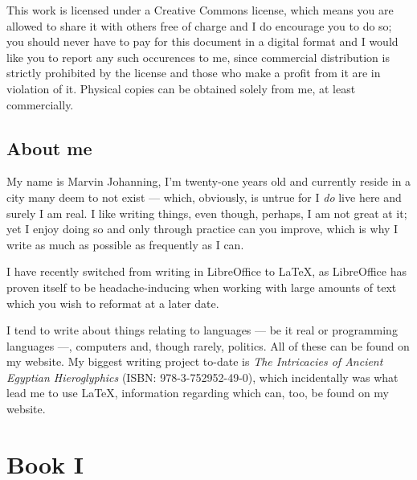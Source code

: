 \documentclass[a5paper,twoside,12pt]{report}
\begin{document}
This work is licensed under a Creative Commons license, which means you are allowed to share it with others free of charge and I do encourage you to do so; you should never have to pay for this document in a digital format and I would like you to report any such occurences to me, since commercial distribution is strictly prohibited by the license and those who make a profit from it are in violation of it. Physical copies can be obtained solely from me, at least commercially. 


\newpage

\chapter*{About me}

  My name is Marvin Johanning, I'm twenty-one years old and currently reside in a city many deem to not exist — which, obviously, is untrue for I \textit{do} live here and surely I am real. I like writing things, even though, perhaps, I am not great at it; yet I enjoy doing so and only through practice can you improve, which is why I write as much as possible as frequently as I can.

  I have recently switched from writing in LibreOffice to \LaTeX, as LibreOffice has proven itself to be headache-inducing when working with large amounts of text which you wish to reformat at a later date. 

  I tend to write about things relating to languages — be it real or programming languages —, computers and, though rarely, politics. All of these can be found on my website. My biggest writing project to-date is \textit{The Intricacies of Ancient Egyptian Hieroglyphics} (ISBN: 978-3-752952-49-0), which incidentally was what lead me to use \LaTeX, information regarding which can, too, be found on my website.
  \newpage


\thispagestyle{empty}
  \mbox{}
  \newpage

\part*{Book I}
  \newpage

\thispagestyle{empty}
  \mbox{}
  \newpage
\end{document}
